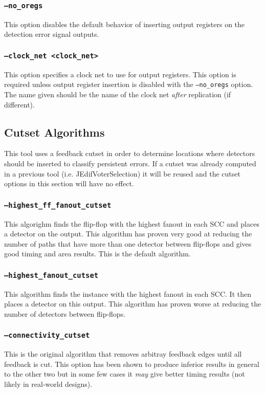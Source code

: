 \subsubsection{\texttt{--no\_oregs}}
This option disables the default behavior of inserting output registers on the
detection error signal outputs.

\subsubsection{\texttt{--clock\_net <clock\_net>}}
This option specifies a clock net to use for output registers. This option is
required unless output register insertion is disabled with the
\texttt{--no\_oregs} option. The name given should be the name of the clock net
\emph{after} replication (if different).

\subsection{Cutset Algorithms}
This tool uses a feedback cutset in order to determine locations where
detectors should be inserted to classify persistent errors. If a cutset was
already computed in a previous tool (i.e. JEdifVoterSelection) it will be
reused and the cutset options in this section will have no effect.

\subsubsection{\texttt{--highest\_ff\_fanout\_cutset}}
This algorighm finds the flip-flop with the highest fanout in each SCC and 
places a detector on the output. This algorithm has proven very good at reducing 
the number of paths that have more than one detector between flip-flops and
gives good timing and area results. This is the default algorithm.

\subsubsection{\texttt{--highest\_fanout\_cutset}}
This algorithm finds the instance with the highest fanout in each SCC.
It then places a detector on this output. This algorithm has proven worse 
at reducing the number of detectors between flip-flops.

\subsubsection{\texttt{--connectivity\_cutset}}
This is the original algorithm that removes arbitray feedback edges until all
feedback is cut. This option has been shown to produce inferior results in
general to the other two but in some few cases it \emph{may} give better timing
results (not likely in real-world designs).




